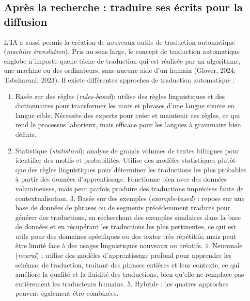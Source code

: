 \documentclass[
  letterpaper,
  DIV=11,
  numbers=noendperiod,
  oneside]{scrreprt}
\providecommand{\tightlist}{%
  \setlength{\itemsep}{0pt}\setlength{\parskip}{0pt}}\usepackage{longtable,booktabs,array}
\begin{document}
\hypertarget{apruxe8s-la-recherche-traduire-ses-uxe9crits-pour-la-diffusion}{%
\subsection{Après la recherche : traduire ses écrits pour la
diffusion}\label{apruxe8s-la-recherche-traduire-ses-uxe9crits-pour-la-diffusion}}

L'IA a aussi permis la création de nouveaux outils de traduction
automatique (\emph{machine translation}). Pris au sens large, le concept
de traduction automatique englobe n'importe quelle tâche de traduction
qui est réalisée par un algorithme, une machine ou des ordinateurs, sans
aucune aide d'un humain (Glover, 2024; Tabsharani, 2023). Il existe
différentes approches de traduction automatique :

\begin{enumerate}
\def\labelenumi{\arabic{enumi}.}
\tightlist
\item
  Basée sur des règles (\emph{rules-based}): utilise des règles
  linguistiques et des dictionnaires pour transformer les mots et
  phrases d'une langue source en langue cible. Nécessite des experts
  pour créer et maintenir ces règles, ce qui rend le processus
  laborieux, mais efficace pour les langues à grammaire bien définie.
\item
  Statistique (\emph{statistical}): analyse de grands volumes de textes
  bilingues pour identifier des motifs et probabilités. Utilise des
  modèles statistiques plutôt que des règles linguistiques pour
  déterminer les traductions les plus probables à partir des données
  d'apprentissage. Fonctionne bien avec des données volumineuses, mais
  peut parfois produire des traductions imprécises faute de
  contextualisation. 3. Basée sur des exemples (\emph{example-based}) :
  repose sur une base de données de phrases ou de segments précédemment
  traduits pour générer des traductions, en recherchant des exemples
  similaires dans la base de données et en récupérant les traductions
  les plus pertinentes, ce qui est utile pour des domaines spécifiques
  ou des textes très répétitifs, mais peut être limité face à des usages
  linguistiques nouveaux ou créatifs. 4. Neuronale (\emph{neural}) :
  utilise des modèles d'apprentissage profond pour apprendre les schémas
  de traduction, traitant des phrases entières et leur contexte, ce qui
  améliore la qualité et la fluidité des traductions, bien qu'elle ne
  remplace pas entièrement les traducteurs humains. 5. Hybride : les
  quatres approches peuvent également être combinées.
\end{enumerate}
\end{document}
